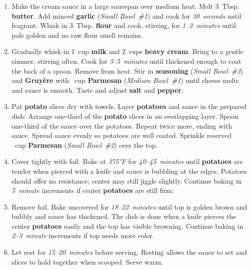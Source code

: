 \documentclass[11pt,letterpaper]{article}
\begin{document}
\begin{enumerate}
    \item Make the cream sauce in a large saucepan over medium heat: Melt 3~Tbsp. \textbf{butter}. Add minced \textbf{garlic} (\textit{Small Bowl~\#1}) and cook for \textit{30~seconds} until fragrant. Whisk in 3~Tbsp. \textbf{flour} and cook, stirring, for \textit{1--2~minutes} until pale golden and no raw flour smell remains.

    \item Gradually whisk in 1~cup \textbf{milk} and 2~cups \textbf{heavy cream}. Bring to a gentle simmer, stirring often. Cook for \textit{3--5~minutes} until thickened enough to coat the back of a spoon. Remove from heat. Stir in \textbf{seasoning} (\textit{Small Bowl~\#3}) and \textbf{Gruyère} with ~cup \textbf{Parmesan} (\textit{Medium Bowl~\#1}) until cheese melts and sauce is smooth. Taste and adjust \textbf{salt} and \textbf{pepper}.

    \item Pat \textbf{potato} slices dry with towels. Layer \textbf{potatoes} and sauce in the prepared dish: Arrange one-third of the \textbf{potato} slices in an overlapping layer. Spoon one-third of the sauce over the potatoes. Repeat twice more, ending with sauce. Spread sauce evenly so potatoes are well coated. Sprinkle reserved ~cup \textbf{Parmesan} (\textit{Small Bowl~\#2}) over the top.

    \item Cover tightly with foil. Bake at \textit{375°F} for \textit{40--45~minutes} until \textbf{potatoes} are tender when pierced with a knife and sauce is bubbling at the edges. Potatoes should offer no resistance; center may still jiggle slightly. Continue baking in \textit{5~minute} increments if center \textbf{potatoes} are still firm.

    \item Remove foil. Bake uncovered for \textit{18--22~minutes} until top is golden brown and bubbly and sauce has thickened. The dish is done when a knife pierces the center \textbf{potatoes} easily and the top has visible browning. Continue baking in \textit{2--3~minute} increments if top needs more color.

    \item Let rest for \textit{15--20~minutes} before serving. Resting allows the sauce to set and slices to hold together when scooped. Serve warm.
\end{enumerate}
\end{document}
